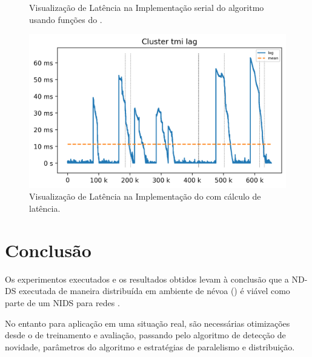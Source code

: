 \begin{figure}[htb]
\begin{minipage}{0.49\textwidth}
    \caption{Visualização de Latência na Implementação serial do algoritmo \minas usando funções do \mfog.}
    \label{fig:lag-serial}
  \end{minipage}
  \hfill
  \begin{minipage}{0.49\textwidth}
    \centering
    \includegraphics[width=1\linewidth]{experiments/lag-mfog.png}
    \caption{Visualização de Latência na Implementação do \mfog com cálculo de latência.}
    \label{fig:lag-mfog}
  \end{minipage}
\end{figure}

\FloatBarrier
\section{Conclusão}
\label{sec:exp-conclusao}

Os experimentos executados e os resultados obtidos levam à conclusão que a
\acf{ND-DS} executada de maneira distribuída em ambiente de névoa (\fog) é
viável como parte de um \acf{NIDS} para redes \iot.


No entanto para aplicação em uma situação real, são necessárias otimizações
desde o \dataset de treinamento e avaliação, passando pelo algoritmo de detecção
de novidade, parâmetros do algoritmo e estratégias de paralelismo e
distribuição.

